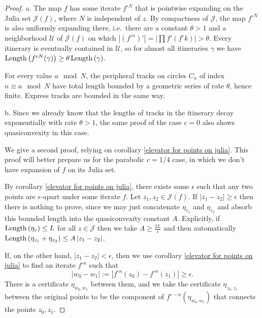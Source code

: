 \begin{proof}
a. The map $f$ has some iterate $f^{\circ N}$ that is pointwise expanding on the Julia set $\mathcal{J}(f)$, where $N$ is independent of $z$.
By compactness of $\mathcal J$, the map $f^{\circ N}$ is also uniformly expanding there, i.e.\ there are a constant $\theta>1$ and a neighborhood $\mathcal{U}$ of $\mathcal{J}(f)$ on which $\left|(f^{\circ n})'\right|=|\prod f'(f^\circ k) |>\theta$. 
Every itinerary is eventually contained in $\mathcal{U}$, so for almost all itineraries $\gamma$ we have $\operatorname{Length} \left( f^{\circ N}(\gamma) \right) \geq \theta \operatorname{Length} \left( \gamma \right)$. 

For every value $a \mod N$, the peripheral tracks on circles $C_n$ of index $n \equiv a \mod N$ have total length bounded by a geometric series of rate $\theta$, hence finite. Express tracks are bounded in the same way. %

b.
 Since we already know that the lengths of tracks in the itinerary decay exponentially with rate $\theta>1$, the same proof of the case $c=0$ also shows quasiconvexity in this case.

We give a second proof, relying on corollary \ref{elevator for points on julia}. This proof will better prepare us for the
parabolic $c=1/4$ case, in which we don't have expansion of $f$ on its Julia set.

By corollary \ref{elevator for points on julia}, there exists some $\epsilon$ such that any two points are $\epsilon$-apart under some iterate $f$. 
Let $z_{1},z_{2}\in\mathcal{J}(f)$. If $\left|z_{1}-z_{2}\right|\geq\epsilon$ then there is nothing to
prove, since we may just concatenate $\eta_{z_{1}}$ and $\eta_{z_{2}}$
and absorb this bounded length into the quasiconvexity constant
$A$. Explicitly, if $\operatorname{Length}\left(\eta_{z}\right)\leq L$
for all $z\in\mathcal{J}$ then we take $A\geq\frac{2L}{\epsilon}$
and then automatically $\operatorname{Length}\left(\eta_{z_{1}}+\eta_{z_{2}}\right)\leq A\left|z_{1}-z_{2}\right|$.

If, on the other hand, $\left|z_{1}-z_{2}\right|<\epsilon$, then
we use  corollary \ref{elevator for points on julia} to find an iterate $f^{\circ n}$ such that 
\begin{equation}
	|w_0-w_1|:=\left|f^{\circ n}(z_{0})-f^{\circ n}(z_{1})\right|\geq\epsilon.
\end{equation}
There is a certificate $\eta_{w_0,w_1}$
between them, and we take the certificate $\eta_{z_{0},z_{1}}$ between
the original points to be the component of $f^{\circ-n}\left(\eta_{w_0,w_1}\right)$
that connects the points $z_{0},z_{1}$.


\end{proof}
